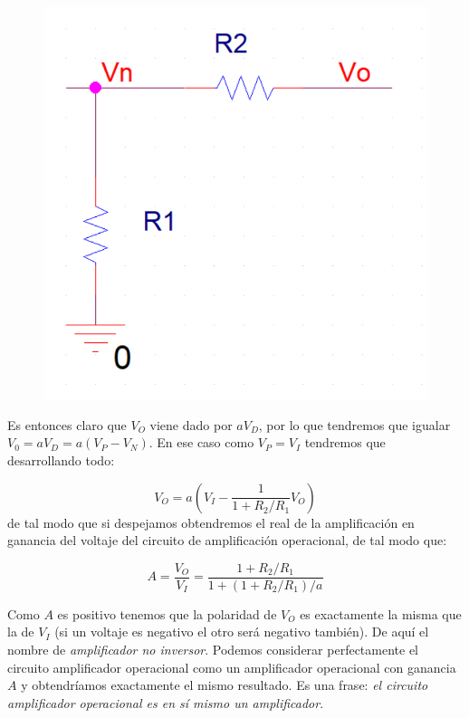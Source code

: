 \documentclass[12pt,a4paper]{article}
\numberwithin{equation}{section}
\numberwithin{figure}{section}
\newcommand{\parentesis}[1]{\left( #1  \right)}
\begin{document}
\begin{figure}[h!] \centering
\includegraphics[scale=0.35]{1.3-Amplificador-inversor-3.png}
\caption{}
\label{Fig:1.3-Amplificador-inversor-3}
\end{figure} 


Es entonces claro que $V_O$ viene dado por $aV_D$, por lo que tendremos que igualar $V_0 = a V_D = a (V_P - V_N)$. En ese caso como $V_P = V_I$ tendremos que desarrollando todo:

\begin{equation}
V_O = a \parentesis{V_I - \dfrac{1}{1+R_2/R_1} V_O} 
\end{equation} 
de tal modo que si despejamos obtendremos el real de la amplificación en ganancia del voltaje del circuito de amplificación operacional, de tal modo que:

\begin{equation}
A = \dfrac{V_O}{V_I} = \dfrac{1+R_2/R_1}{1+(1+R_2/R_1)/a}
\end{equation}

Como $A$ es positivo tenemos que la polaridad de $V_O$ es exactamente la misma que la de $V_I$ (si un voltaje es negativo el otro será negativo también). De aquí el nombre de \textit{amplificador no inversor}. Podemos considerar perfectamente el circuito amplificador operacional como un amplificador operacional con ganancia $A$ y obtendríamos exactamente el mismo resultado. Es una frase: \textit{el circuito amplificador operacional es en sí mismo un amplificador}. \\
\end{document}
